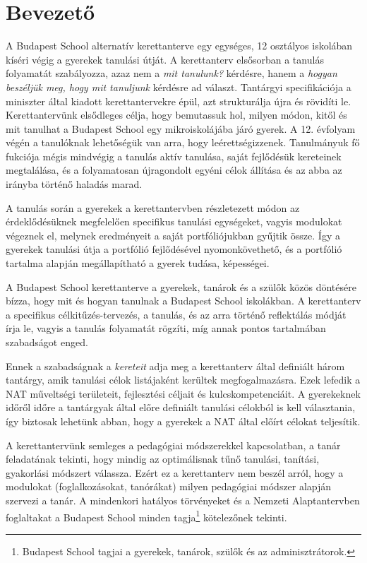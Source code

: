 \chapter{Bevezető}
A Budapest School alternatív kerettanterve egy egységes, 12 osztályos iskolában kíséri végig a gyerekek tanulási útját. A kerettanterv elsősorban a tanulás folyamatát szabályozza, azaz nem a \emph{mit tanulunk?} kérdésre, hanem a \emph{hogyan beszéljük meg, hogy mit tanuljunk} kérdésre ad választ. Tantárgyi specifikációja a miniszter által kiadott kerettantervekre\cite{ofi:kerettanterv} épül, azt strukturálja újra és rövidíti le. Kerettantervünk elsődleges célja, hogy bemutassuk hol, milyen módon, kitől és mit tanulhat a Budapest School egy mikroiskolájába járó gyerek. A 12. évfolyam végén a tanulóknak lehetőségük van arra, hogy leérettségizzenek. Tanulmányuk fő fukciója mégis mindvégig a tanulás aktív tanulása, saját fejlődésük kereteinek megtalálása, és a folyamatosan újragondolt egyéni célok állítása és az abba az irányba történő haladás marad.

A tanulás során a gyerekek a kerettantervben részletezett módon az érdeklődésüknek megfelelően specifikus tanulási egységeket, vagyis modulokat végeznek el, melynek eredményeit a saját portfóliójukban gyűjtik össze. Így a gyerekek tanulási útja a portfólió fejlődésével nyomonkövethető, és a portfólió tartalma alapján megállapítható a gyerek tudása, képességei.

A Budapest School kerettanterve a gyerekek, tanárok és a szülők közös döntésére bízza, hogy mit és hogyan tanulnak a Budapest School iskolákban. A kerettanterv a specifikus célkitűzés-tervezés, a tanulás, és az arra történő reflektálás módját írja le, vagyis a tanulás folyamatát rögzíti, míg annak pontos tartalmában szabadságot enged.

Ennek a szabadságnak a \emph{kereteit} adja meg a kerettanterv által definiált három tantárgy, amik tanulási célok listájaként kerültek megfogalmazásra. Ezek lefedik a NAT műveltségi területeit, fejlesztési céljait és kulcskompetenciáit. A gyerekeknek időről időre a tantárgyak által előre definiált tanulási célokból is kell választania, így biztosak lehetünk abban, hogy a gyerekek a NAT által előírt célokat teljesítik. 

A kerettantervünk semleges a pedagógiai módszerekkel kapcsolatban, a tanár feladatának tekinti, hogy mindig az optimálisnak tűnő tanulási, tanítási, gyakorlási módszert válassza. Ezért ez a kerettanterv nem beszél arról, hogy a modulokat (foglalkozásokat, tanórákat) milyen pedagógiai módszer alapján szervezi a tanár. A mindenkori hatályos törvényeket és a Nemzeti Alaptantervben foglaltakat a Budapest School minden tagja\footnote{Budapest School tagjai a gyerekek, tanárok, szülők és az adminisztrátorok.} kötelezőnek tekinti.

